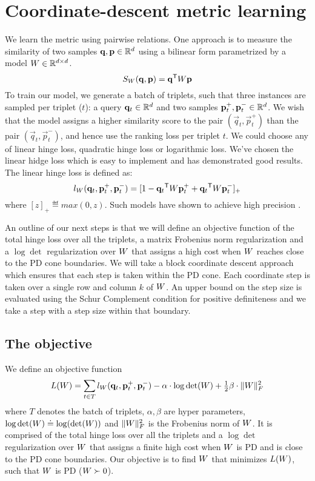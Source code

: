 \documentclass{article}
\begin{document}
\section{Coordinate-descent metric learning}
We learn the metric using pairwise relations. One approach is to measure the similarity of two samples $\mathbf{q}, \mathbf{p} \in \mathbb{R}^d$ using a bilinear form parametrized by a model ${W} \in \mathbb{R}^{d \times d}$.
\begin{equation}
S_{{W}}(\mathbf{q}, \mathbf{p}) = \mathbf{q}{}^\mathsf{T} {W} \mathbf{p}
\end{equation}
To train our model, we generate a batch of triplets, such that three instances are sampled per triplet ($t$): a query $\mathbf{q}_t \in \mathbb{R}^d$ and two samples $\mathbf{p}_{t}^{+}, \mathbf{p}_{t}^{-} \in \mathbb{R}^d$. We wish that the model assigns a higher similarity score to the pair $(\vec{q}_t, \vec{p}_{t}^{+})$ than the pair $(\vec{q}_t, \vec{p}_{t}^{-})$, and hence use the ranking loss per triplet $t$. We could choose any of linear hinge loss, quadratic hinge loss or logarithmic loss. We've chosen the linear hidge loss which is easy to implement and has demonstrated good results. The linear hinge loss is defined as:
\begin{equation}
l_{{W}}(\mathbf{q}_t, \mathbf{p}_{t}^{+}, \mathbf{p}_{t}^{-})=[1-\mathbf{q}_{t}{}^\mathsf{T} {W} \mathbf{p}_{t}^{+}+\mathbf{q}_{t}{}^\mathsf{T}{W}\mathbf{p}_{t}^{-}]_{+}
\label{hingelt}
\end{equation}
where $[z]_{+} \eqdef max(0,z)$. Such models have shown to achieve high precision \cite{oasis, qian}.

An outline of our next steps is that we will define an objective function of the total hinge loss over all the triplets, a matrix Frobenius norm regularization and a $\log \det$ regularization over ${W}$ that assigns a high cost when ${W}$ reaches close to the PD cone boundaries. 
We will take a block coordinate descent approach which ensures that each step is taken within the PD cone. Each coordinate step is taken over a single row and column $k$ of ${W}$. An upper bound on the step size is  evaluated using the Schur Complement condition for positive definiteness  and we take a step with a step size within that boundary. 

\subsection{The objective}
We define an objective function
\begin{equation}
L({W})=\sum\limits_{t\in T}{l_{{W}}(\mathbf{q}_t, \mathbf{p}_{t}^{+}, \mathbf{p}_{t}^{-})} - \alpha \cdot \log \det({W}) + \tfrac{1}{2} \beta \cdot \| {W} \|_{F}^{2} 
\end{equation}
where $T$ denotes the batch of triplets, $\alpha, \beta$ are hyper parameters,  $\log \det({W}) \doteq \log (\det({W}))$ and $\| {W} \|_{F}^{2}$ is the Frobenius norm of ${W}$. It is comprised of the total hinge loss over all the triplets and a $\log \det$ regularization over ${W}$ that assigns a finite high cost when ${W}$ is PD and is close to the PD cone boundaries. 
Our objective is to find ${W}$ that minimizes $L({W})$, such that ${W}$ is PD (${W}\succ 0$).
\end{document}
